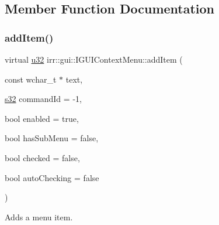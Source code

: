\subsection{Member Function Documentation}
\mbox{\label{classirr_1_1gui_1_1IGUIContextMenu_afa25240cb37816c3f8941ccc0f2c14ea}} 
\subsubsection{\texorpdfstring{add\+Item()}{addItem()}\hspace{0.1cm}{\footnotesize\ttfamily [1/2]}}
{\footnotesize\ttfamily virtual \hyperlink{namespaceirr_a0416a53257075833e7002efd0a18e804}{u32} irr\+::gui\+::\+I\+G\+U\+I\+Context\+Menu\+::add\+Item (\begin{DoxyParamCaption}\item[{const wchar\+\_\+t $\ast$}]{text,  }\item[{\hyperlink{namespaceirr_ac66849b7a6ed16e30ebede579f9b47c6}{s32}}]{command\+Id = {\ttfamily -\/1},  }\item[{bool}]{enabled = {\ttfamily true},  }\item[{bool}]{has\+Sub\+Menu = {\ttfamily false},  }\item[{bool}]{checked = {\ttfamily false},  }\item[{bool}]{auto\+Checking = {\ttfamily false} }\end{DoxyParamCaption})\hspace{0.3cm}{\ttfamily [pure virtual]}}



Adds a menu item. 


